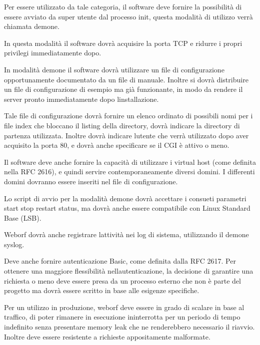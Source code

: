 \documentclass[a4paper,11pt]{article}
\begin{document}
{\sffamily
Per essere utilizzato da tale categoria, il software deve fornire la
possibilit\`a di essere avviato da super utente dal processo init,
questa modalit\`a di utilizzo verr\`a chiamata
{\textquotedbl}demone{\textquotedbl}.}

{\sffamily
In questa modalit\`a il software dovr\`a acquisire la porta TCP e
ridurre i propri privilegi immediatamente dopo.}

{\sffamily
In modalit\`a demone il software dovr\`a utilizzare un file di
configurazione opportunamente documentato da un file di manuale.
Inoltre si dovr\`a distribuire un file di configurazione di esempio ma
gi\`a funzionante, in modo da rendere il server pronto immediatamente
dopo l{\textquotesingle}installazione.}

{\sffamily
Tale file di configurazione dovr\`a fornire un elenco ordinato di
possibili nomi per i file index che bloccano il listing della
directory, dovr\`a indicare la directory di partenza utilizzata.
Inoltre dovr\`a indicare l{\textquotesingle}utente che verr\`a
utilizzato dopo aver acquisito la porta 80, e dovr\`a anche specificare
se il CGI \`e attivo o meno.}

{\sffamily
Il software deve anche fornire la capacit\`a di utilizzare i virtual
host (come definita nella RFC 2616), e quindi servire
contemporaneamente diversi domini. I differenti domini dovranno essere
inseriti nel file di configurazione.}

{\sffamily
Lo script di avvio per la modalit\`a demone dovr\`a accettare i consueti
parametri {\textquotedbl}start{\textquotedbl}
{\textquotedbl}stop{\textquotedbl}
{\textquotedbl}restart{\textquotedbl}
{\textquotedbl}status{\textquotedbl}, ma dovr\`a anche essere
compatibile con Linux Standard Base (LSB).}

{\sffamily
Weborf dovr\`a anche registrare l{\textquotesingle}attivit\`a nei log di
sistema, utilizzando il demone syslog.}

{\sffamily
Deve anche fornire autenticazione Basic, come definita dalla RFC 2617.
Per ottenere una maggiore flessibilit\`a
nell{\textquotesingle}autenticazione, la decisione di garantire una
richiesta o meno deve essere presa da un processo esterno che non \`e
parte del progetto ma dovr\`a essere scritto in base alle esigenze
specifiche.}

{\sffamily
Per un utilizzo in produzione, weborf deve essere in grado di scalare in
base al traffico, di poter rimanere in esecuzione ininterrotta per un
periodo di tempo indefinito senza presentare memory leak che ne
renderebbero necessario il riavvio. Inoltre deve essere resistente a
richieste appositamente malformate.}
\end{document}
